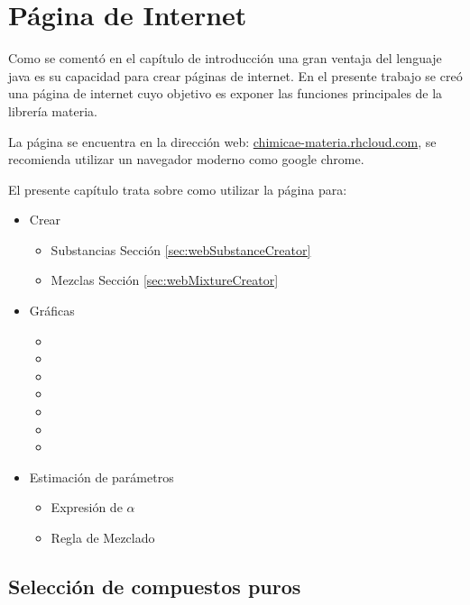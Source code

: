 \chapter{Página de Internet}\label{chap:webPage}

	Como se comentó en el capítulo de introducción una gran ventaja del lenguaje java es su capacidad para crear páginas de internet. En el presente trabajo se creó una página de internet cuyo objetivo es exponer las funciones principales de la librería materia.

	La página se encuentra en la dirección web: \url{chimicae-materia.rhcloud.com}, se recomienda utilizar un navegador moderno como google chrome.

	El presente capítulo trata sobre como utilizar la página para:

	\begin{itemize}
		\item{Crear}
			\begin{itemize}
				\item{Substancias} Sección \ref{sec:webSubstanceCreator}
				\item{Mezclas} Sección \ref{sec:webMixtureCreator}
			\end{itemize}
		\item{Gráficas}
			\begin{itemize}
				\item {}
				\item {}
				\item {}
				\item {}
				\item {}
				\item {}
				\item {}
			\end{itemize}
		\item{Estimación de parámetros}
			\begin{itemize}
				\item Expresión de $\alpha$
				\item Regla de Mezclado
			\end{itemize}
	\end{itemize}

\section{Selección de compuestos puros}\label{sec:webCompounds}

